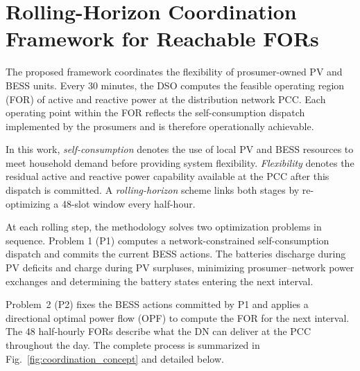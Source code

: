 \documentclass[journal]{IEEEtran}
\begin{document}
\section{Rolling-Horizon Coordination Framework for Reachable FORs}
\label{sec:method}


The proposed framework coordinates the flexibility of prosumer-owned PV and BESS units. Every 30 minutes, the DSO computes the feasible operating region (FOR) of active and reactive power at the distribution network PCC. Each operating point within the FOR reflects the self-consumption dispatch implemented by the prosumers and is therefore operationally achievable.

In this work, \textit{self-consumption} denotes the use of local PV and BESS resources to meet household demand before providing system flexibility. \textit{Flexibility} denotes the residual active and reactive power capability available at the PCC after this dispatch is committed. A \textit{rolling-horizon} scheme links both stages by re-optimizing a 48-slot window every half-hour.

At each rolling step, the methodology solves two optimization problems in sequence. Problem 1 (P1) computes a network-constrained self-consumption dispatch and commits the current BESS actions. The batteries discharge during PV deficits and charge during PV surpluses, minimizing prosumer--network power exchanges and determining the battery states entering the next interval.

Problem~2 (P2) fixes the BESS actions committed by P1 and applies a directional optimal power flow (OPF) to compute the FOR for the next interval. The 48 half-hourly FORs describe what the DN can deliver at the PCC throughout the day. The complete process is summarized in Fig.~\ref{fig:coordination_concept} and detailed below.
\end{document}
